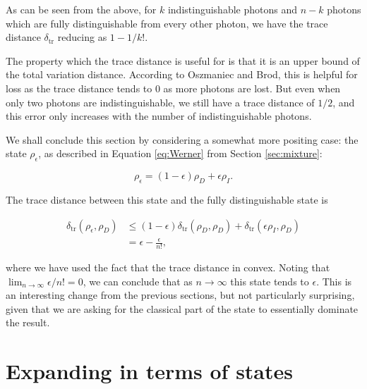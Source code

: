As can be seen from the above, for $k$ indistinguishable photons and $n-k$ photons which are fully distinguishable from every other photon, we have the trace distance $\delta_{\mathrm{tr}}$ reducing as $1 - 1/k!$.

The property which the trace distance is useful for is that it is an upper bound of the total variation distance. According to Oszmaniec and Brod, this is helpful for loss as the trace distance tends to $0$ as more photons are lost. But even when only two photons are indistinguishable, we still have a trace distance of $1/2$, and this error only increases with the number of indistinguishable photons.

We shall conclude this section by considering a somewhat more positing case: the state $\rho_\epsilon$, as described in Equation \ref{eq:Werner} from Section \ref{sec:mixture}:

\begin{equation}
\rho_\epsilon = (1-\epsilon)\rho_D + \epsilon\rho_I.
\end{equation}

The trace distance between this state and the fully distinguishable state is

\begin{align}
\delta_{\textrm{tr}}(\rho_\epsilon,\rho_D) &\leq (1-\epsilon)\delta_{\textrm{tr}}(\rho_D,\rho_D) + \delta_{\textrm{tr}}(\epsilon\rho_I,\rho_D)\\
&= \epsilon-\frac{\epsilon}{n!},
\end{align}

\noindent where we have used the fact that the trace distance in convex. Noting that $\lim_{n\rightarrow\infty}\epsilon/n! = 0$, we can conclude that as $n\rightarrow\infty$ this state tends to $\epsilon$. This is an interesting change from the previous sections, but not particularly surprising, given that we are asking for the classical part of the state to essentially dominate the result.

\section{Expanding in terms of states}
\label{sec:expansion}


